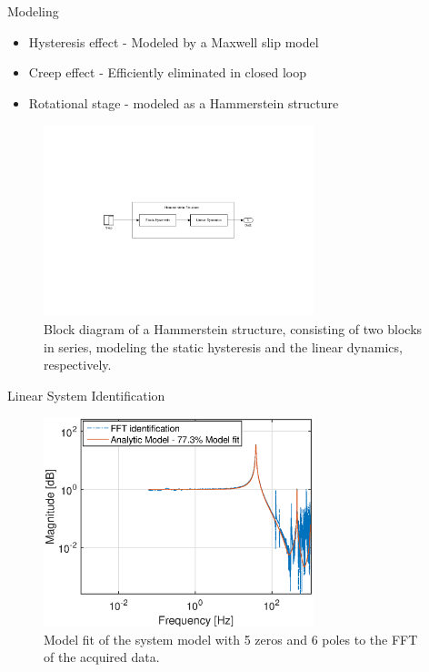 \documentclass[10pt]{beamer}
\begin{document}
\begin{frame}{Modeling}
  \begin{itemize}
    \item \alert{Hysteresis effect} - Modeled by a Maxwell slip model
    \item \alert{Creep effect} - Efficiently eliminated in closed loop
    \item \alert{Rotational stage} - modeled as a Hammerstein structure
  \end{itemize}
  \begin{figure}[h]
    \centering %
    \includegraphics[width=0.7\textwidth, trim=8cm 8cm 7.73cm 8cm, clip=true]{../fig/matlab/hammerstein}
    \caption{\label{fig:hammerstein}Block diagram of a Hammerstein structure, consisting of two blocks in series, modeling the static hysteresis and the linear dynamics, respectively.}
  \end{figure}
\end{frame}

\begin{frame}{Linear System Identification}
  \begin{figure}[h!]
    \centering
    \includegraphics[width=0.7\textwidth]{../fig/matlab/model.eps}
    \caption{\label{fig:model} Model fit of the system model with 5 zeros and 6 poles to the \textsc{FFT} of the acquired data.}
  \end{figure}
\end{frame}
\end{document}
